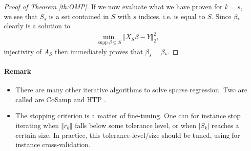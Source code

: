 \documentclass{article}
\DeclareMathOperator{\supp}{\mathrm{supp}}
\newcommand{\sse}{\subseteq}
\newcommand{\abs}[1]{\vert #1 \vert}
\newcommand{\norm}[1]{\Vert #1 \Vert}
\begin{document}
\begin{proof}[Proof of Theorem \ref{th:OMP}]
If we now evaluate what we have proven for $k=s$, we see that $S_s$ is a set contained in $S$ with $s$ indices, i.e. is equal to $S$. Since $\beta_*$ clearly is a solution to 
\begin{align*}
    \min_{\supp \beta \sse S} \norm{X_{S}\beta - Y}_2^2,
\end{align*}
injectivity of $A_S$ then immediately proves that $\beta_s=\beta_*$.
\end{proof}

\paragraph{Remark}
\begin{itemize}
     \item There are many other iterative algorithms to solve sparse regression. Two are called are CoSamp \cite{needell2010cosamp} and HTP \cite{foucart2011hard}.
    \item The stopping criterion is a matter of fine-tuning. One can for instance stop iterating when $\norm{r_k}$ falls below some tolerance level, or when $\abs{S_k}$ reaches a certain size. In practice, this tolerance-level/size should be tuned, using for instance cross-validation.
\end{itemize}
\end{document}
